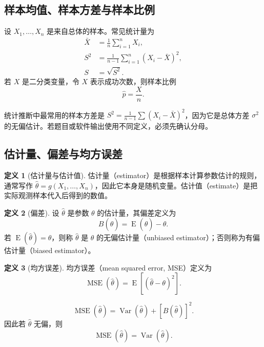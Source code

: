 \documentclass[11pt,a4paper]{article}
\theoremstyle{definition}
\newtheorem{definition}{定义}[section]
\theoremstyle{plain}
\theoremstyle{remark}
\newcommand{\E}{\operatorname{E}}
\newcommand{\Var}{\operatorname{Var}}
\newcommand{\MSE}{\operatorname{MSE}}
\begin{document}
\subsection{样本均值、样本方差与样本比例}

设 $X_1,\ldots,X_n$ 是来自总体的样本。常见统计量为
\begin{align}
    \bar X &= \frac{1}{n}\sum_{i=1}^n X_i,\\
    S^2 &= \frac{1}{n-1}\sum_{i=1}^n (X_i-\bar X)^2,\\
    S &= \sqrt{S^2}.
\end{align}
若 $X$ 是二分类变量，令 $X$ 表示成功次数，则样本比例
\[
    \hat p=\frac{X}{n}.
\]

\begin{warnbox}[样本方差的分母]
统计推断中最常用的样本方差是 $S^2=\frac{1}{n-1}\sum (X_i-\bar X)^2$，因为它是总体方差 $\sigma^2$ 的无偏估计。若题目或软件输出使用不同定义，必须先确认分母。
\end{warnbox}

\subsection{估计量、偏差与均方误差}

\begin{definition}[估计量与估计值]
估计量（estimator）是根据样本计算参数估计的规则，通常写作 $\hat\theta=g(X_1,\ldots,X_n)$，因此它本身是随机变量。估计值（estimate）是把实际观测样本代入后得到的数值。
\end{definition}

\begin{definition}[偏差]
设 $\hat\theta$ 是参数 $\theta$ 的估计量，其偏差定义为
\[
    B(\hat\theta)=\E(\hat\theta)-\theta.
\]
若 $\E(\hat\theta)=\theta$，则称 $\hat\theta$ 是 $\theta$ 的无偏估计量（unbiased estimator）；否则称为有偏估计量（biased estimator）。
\end{definition}

\begin{definition}[均方误差]
均方误差（mean squared error, MSE）定义为
\[
    \MSE(\hat\theta)=\E\left[(\hat\theta-\theta)^2\right].
\]
\end{definition}

\begin{memorybox}
\[
    \boxed{\MSE(\hat\theta)=\Var(\hat\theta)+\left[B(\hat\theta)\right]^2.}
\]
因此若 $\hat\theta$ 无偏，则
\[
    \MSE(\hat\theta)=\Var(\hat\theta).
\]
\end{memorybox}
\end{document}
